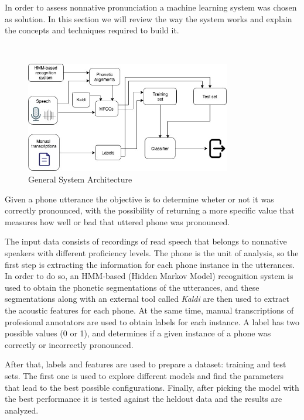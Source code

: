 In order to assess nonnative pronunciation a machine learning system was chosen as solution.
In this section we will review the way the system works and explain the concepts
and techniques required to build it.

~

\begin{figure}[H]
	\centering
	\includegraphics[width=0.8\textwidth]{files/figures/method/general-structure.jpg}
	\caption{General System Architecture}
	\label{fig:methodGeneralArchitecture}
\end{figure}

Given a phone utterance the objective is to determine wheter or not it was correctly
pronounced, with the possibility of returning
a more specific value that measures how well or bad that uttered phone
was pronounced.

The input data consists of recordings of read
speech that belongs to nonnative speakers with different proficiency levels.
The phone is the unit of analysis, so the first step is extracting the information
for each phone instance in the utterances.  In order to do so,
an HMM-based (Hidden Markov Model) recognition system is used to obtain the phonetic
segmentations of the utterances, and these segmentations along with an external tool
called \emph{Kaldi} are then used to extract the
acoustic features for each phone. At the same time, manual transcriptions of profesional
annotators are used to obtain labels for each instance. A label has two possible values (0 or 1),
and determines if a given instance of a phone was correctly or incorrectly pronounced.

After that, labels and features are used to prepare a dataset: training and test sets. The first
one is used to explore different models and find the parameters that lead to the
best possible configurations.
Finally, after picking the model with the best performance it is tested against the heldout data
and the results are analyzed.


